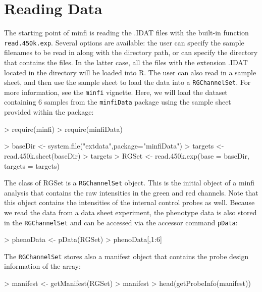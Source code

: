 \documentclass[12pt]{article}
\newcommand{\Rcode}[1]{{\texttt{#1}}}
\newcommand{\Rpackage}[1]{\textsf{#1}}
\newcommand{\software}[1]{\textsf{#1}}
\newcommand{\R}{\software{R}}
\newcommand{\minfi}{\software{minfi}}
\begin{document}
\section{Reading Data}
The starting point of \Rpackage{minfi} is reading the .IDAT files with the built-in function \Rcode{read.450k.exp}. Several options are available: the user can specify the sample filenames to be read in along with the directory path, or can specify the directory that contains the files. In the latter case, all the files with the extension .IDAT located in the directory will be loaded into \R{}. The user can also read in a sample sheet, and then use the sample sheet to load the data into a \Rcode{RGChannelSet}. For more information, see the \texttt{minfi} vignette. Here, we will load the dataset containing 6 samples from the \texttt{minfiData} package using the sample sheet provided within the package:
\begin{Schunk}
\begin{Sinput}
> require(minfi)
> require(minfiData)
\end{Sinput}
\end{Schunk}
\begin{Schunk}
\begin{Sinput}
> baseDir <- system.file("extdata",package="minfiData")
> targets <- read.450k.sheet(baseDir)
> targets
> RGSet <- read.450k.exp(base = baseDir, targets = targets)
\end{Sinput}
\end{Schunk}
The class of RGSet is a \Rcode{RGChannelSet} object. This is the initial object of a \minfi{} analysis that contains the raw intensities in the green and red channels. Note that this object contains the intensities of the internal control probes as well. Because we read the data from a data sheet experiment, the phenotype data is also stored in the \Rcode{RGChannelSet} and can be accessed via the accessor command \Rcode{pData}:
\begin{Schunk}
\begin{Sinput}
> phenoData <- pData(RGSet)
> phenoData[,1:6]
\end{Sinput}
\end{Schunk}
The \Rcode{RGChannelSet} stores also a manifest object that contains the probe design information of the array:
\begin{Schunk}
\begin{Sinput}
> manifest <- getManifest(RGSet)
> manifest
> head(getProbeInfo(manifest))
\end{Sinput}
\end{Schunk}
\end{document}
